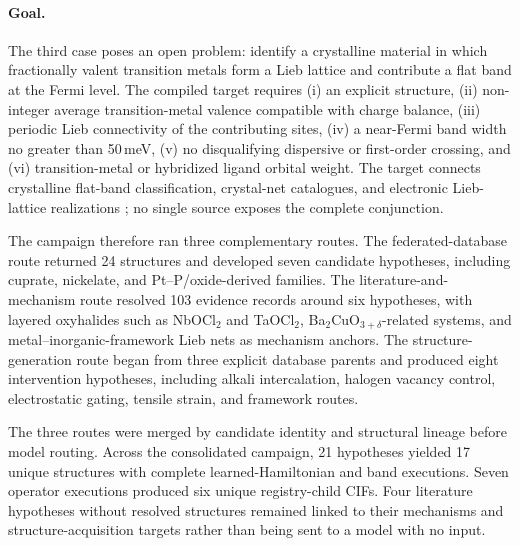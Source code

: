 \paragraph{Goal.}
The third case poses an open problem: identify a crystalline material in which fractionally valent transition metals form a Lieb lattice and contribute a flat band at the Fermi level.  The compiled target requires (i) an explicit structure, (ii) non-integer average transition-metal valence compatible with charge balance, (iii) periodic Lieb connectivity of the contributing sites, (iv) a near-Fermi band width no greater than 50\,meV, (v) no disqualifying dispersive or first-order crossing, and (vi) transition-metal or hybridized ligand orbital weight.  The target connects crystalline flat-band classification, crystal-net catalogues, and electronic Lieb-lattice realizations \cite{calugaru2022flatbands,neves2024crystalnets,drost2017lieb}; no single source exposes the complete conjunction.

The campaign therefore ran three complementary routes.  The federated-database route returned 24 structures and developed seven candidate hypotheses, including cuprate, nickelate, and Pt--P/oxide-derived families.  The literature-and-mechanism route resolved 103 evidence records around six hypotheses, with layered oxyhalides such as NbOCl$_2$ and TaOCl$_2$, Ba$_2$CuO$_{3+\delta}$-related systems, and metal--inorganic-framework Lieb nets as mechanism anchors.  The structure-generation route began from three explicit database parents and produced eight intervention hypotheses, including alkali intercalation, halogen vacancy control, electrostatic gating, tensile strain, and framework routes.

The three routes were merged by candidate identity and structural lineage before model routing.  Across the consolidated campaign, 21 hypotheses yielded 17 unique structures with complete learned-Hamiltonian and band executions.  Seven operator executions produced six unique registry-child CIFs.  Four literature hypotheses without resolved structures remained linked to their mechanisms and structure-acquisition targets rather than being sent to a model with no input.

